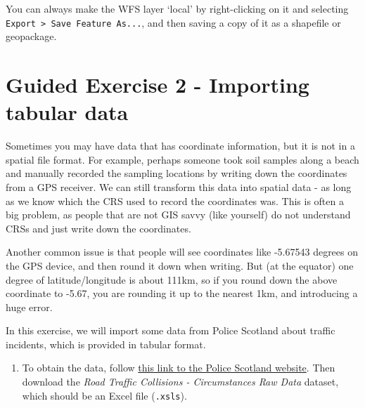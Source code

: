 \documentclass[
  letterpaper,
  DIV=11,
  numbers=noendperiod]{scrreprt}
\providecommand{\tightlist}{%
  \setlength{\itemsep}{0pt}\setlength{\parskip}{0pt}}\usepackage{longtable,booktabs,array}
\begin{document}
\begin{tcolorbox}[enhanced jigsaw, coltitle=black, toprule=.15mm, breakable, opacitybacktitle=0.6, left=2mm, colback=white, leftrule=.75mm, rightrule=.15mm, colbacktitle=quarto-callout-tip-color!10!white, toptitle=1mm, titlerule=0mm, colframe=quarto-callout-tip-color-frame, arc=.35mm, bottomtitle=1mm, opacityback=0, bottomrule=.15mm, title=\textcolor{quarto-callout-tip-color}{\faLightbulb}\hspace{0.5em}{Tip}]

You can always make the WFS layer `local' by right-clicking on it and
selecting \texttt{Export\ \textgreater{}\ Save\ Feature\ As...}, and
then saving a copy of it as a shapefile or geopackage.

\end{tcolorbox}

\section{Guided Exercise 2 - Importing tabular
data}\label{guided-exercise-2---importing-tabular-data}

Sometimes you may have data that has coordinate information, but it is
not in a spatial file format. For example, perhaps someone took soil
samples along a beach and manually recorded the sampling locations by
writing down the coordinates from a GPS receiver. We can still transform
this data into spatial data - as long as we know which the CRS used to
record the coordinates was. This is often a big problem, as people that
are not GIS savvy (like yourself) do not understand CRSs and just write
down the coordinates.

Another common issue is that people will see coordinates like -5.67543
degrees on the GPS device, and then round it down when writing. But (at
the equator) one degree of latitude/longitude is about 111km, so if you
round down the above coordinate to -5.67, you are rounding it up to the
nearest 1km, and introducing a huge error.

In this exercise, we will import some data from Police Scotland about
traffic incidents, which is provided in tabular format.

\begin{enumerate}
\def\labelenumi{(\arabic{enumi})}
\setcounter{enumi}{306}
\tightlist
\item
  To obtain the data, follow
  \href{https://www.scotland.police.uk/about-us/how-we-do-it/road-traffic-collision-data/}{this
  link to the Police Scotland website}. Then download the \emph{Road
  Traffic Collisions - Circumstances Raw Data} dataset, which should be
  an Excel file (\texttt{.xsls}).
\end{enumerate}
\end{document}
